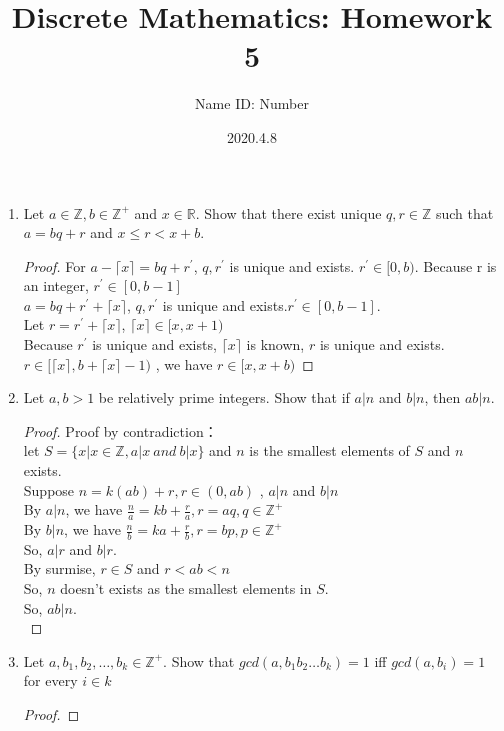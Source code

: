 \documentclass{article}
\title{Discrete Mathematics:  Homework 5}
\author{Name  \quad  \quad ID: Number}
\date{2020.4.8}
\theoremstyle{break}
\begin{document}
\maketitle
\begin{enumerate}
\item Let $a \in \mathbb{Z}, b \in \mathbb{{Z}^+}$ and $x \in \mathbb{{R}}$. Show  that  there  exist  unique $q,r \in \mathbb{{Z}}$ such that $a = bq+r$ and $x \leq r < x+b$.
\begin{proof}
        For $ a - \lceil x \rceil = bq +r^{'}$, $q,r^{'}$ is unique and exists. $r^{' }\in [0,b)$. Because r is an integer, $r^{'} \in [0,b-1]$\\
        $a = bq + r ^{'}+ \lceil x \rceil $, $q,r^{'}$ is unique and exists.$r ^{'}\in [0,b-1]$. \\
        Let $r = r^{'} + \lceil x \rceil  $, $\lceil x \rceil  \in [x, x+1 )$\\
        Because $r^{'}$ is unique and exists, $\lceil x \rceil $ is known, $r$ is unique and exists.\\
        $r \in [\lceil x \rceil , b+\lceil x \rceil -1 )$ , we have $ r \in [ x, x+b )$
\end{proof}
\vspace{30mm}
\item Let $a,b > 1$ be relatively prime integers.  Show that if $a|n$ and $b|n$, then $ab|n$.
\begin{proof}
Proof by contradiction：\\
let $S = \{  x | x \in \mathbb{Z}  , a|x \ and \ b|x \}$  and $n$ is the smallest elements of $S$ and $n$ exists.\\
Suppose $n = k(ab) + r , r \in (0, ab)$ , $a|n$ and $b|n$\\
By $a|n$, we have $\frac{n}{a} = kb + \frac{r}{a} , r = aq ,q \in \mathbb{Z}^+ $ \\
By $b|n$, we have $\frac{n}{b} = ka + \frac{r}{b} , r = bp, p \in \mathbb{Z}^+ $ \\
So, $a|r$ and $b|r$. \\
By surmise, $r \in S$ and $r < ab < n $\\
So, $n$ doesn't exists as the smallest elements in $S$.\\
So, $ab | n$.\\
\end{proof} 
\newpage
\item Let $a, b_1, b_2, \dots , b_k \in \mathbb{Z}^+$. Show that $gcd(a, b_1b_2 \dots b_k) = 1 $ iff $gcd(a, b_i) =1$ for every $i \in {k}$
\begin{proof}

\end{proof}
\end{enumerate}
\end{document}
